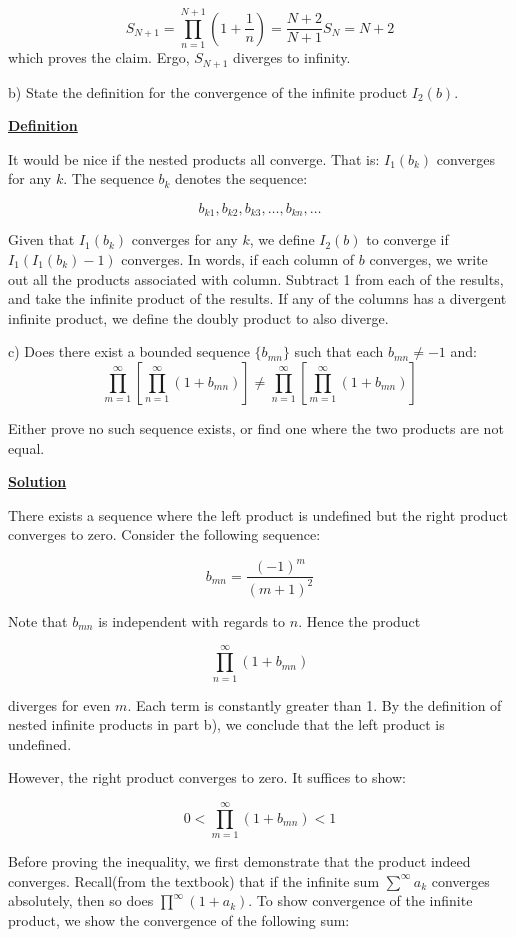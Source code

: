 \documentclass{article}
\newcommand{\new}[1]{
    \vspace{2mm}
    \noindent
    \textbf{
    \underline{#1}}
}
\begin{document}
\[
    S_{N+1} = \prod^{N+1}_{n=1}(1+\frac{1}{n})
    =\frac{N+2}{N+1} S_{N} = N+2
\]
which proves the claim. Ergo, $S_{N+1}$ diverges to infinity. 

\vspace{5mm}
b) State the definition for the convergence of the infinite product 
$I_2(b)$.

\new{Definition}
It would be nice if the nested products all converge. That is:
$I_1(b_k)$ converges for any $k$. The sequence $b_k$ denotes the 
sequence:

\[
    b_{k1}, b_{k2}, b_{k3}, \dots, b_{kn}, \dots
\]

Given that $I_1(b_k)$ converges for any $k$, we define $I_2(b)$ 
to converge if $I_1(I_1(b_k) - 1)$ converges. In words, if each 
column of $b$ converges, we write out all the products associated 
with column. Subtract 1 from each of the results, and take 
the infinite product of the results. If any of the columns 
has a divergent infinite product, we define the doubly product 
to also diverge. 

\newpage
c) Does there exist a bounded sequence 
$\{b_{mn}\}$ such that each $b_{mn} \neq -1$ 
and:
\[
    \prod_{m = 1}^\infty 
    \left[
        \prod_{n = 1}^\infty 
        (1+ b_{mn})
    \right]
    \neq 
    \prod_{n = 1}^\infty 
    \left[
        \prod_{m = 1}^\infty 
        (1+b_{mn})
    \right]
\]

Either prove no such sequence exists, or find one where 
the two products are not equal. 

\new{Solution} 
There exists a sequence where the left product is undefined 
but the right product converges to zero. Consider the following 
sequence:

\[
    b_{mn} = \frac{(-1)^m}{(m + 1)^2}
\]

Note that $b_{mn}$ is independent with regards to $n$. Hence 
the product 

\[
    \prod_{n = 1}^\infty (1+b_{mn})
\]

diverges for even $m$. Each term is constantly greater than 1. 
By the definition of nested infinite products in part b), we conclude 
that the left product is undefined. 

However, the right product converges to zero. It suffices to show:

\[
    0 < \prod_{m = 1}^\infty (1 + b_{mn}) < 1
\]

Before proving the inequality, we first demonstrate that the 
product indeed converges. Recall(from the textbook) that 
if the infinite sum $\sum^\infty a_k$ converges absolutely, then so does 
$\prod^\infty (1+a_k)$. To show convergence of the infinite product, 
we show the convergence of the following sum:
\end{document}

